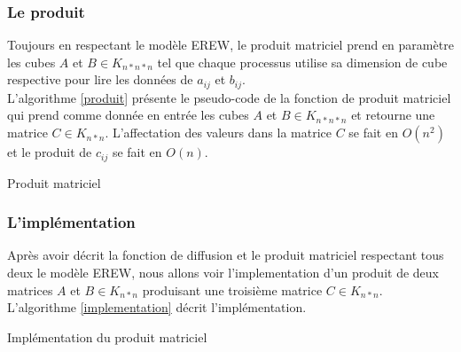 \subsubsection{Le produit}

Toujours en respectant le modèle EREW, le produit matriciel prend en paramètre les cubes $A$ et $B \in K_{n*n*n}$ tel que chaque processus utilise sa dimension de cube respective pour lire les données de $a_{ij}$ et $b_{ij}$.\\

L'algorithme \ref{produit} présente le pseudo-code de la fonction de produit matriciel qui prend comme donnée en entrée les cubes $A$ et $B \in K_{n*n*n}$ et retourne une matrice $C \in K_{n*n}$. L'affectation des valeurs dans la matrice $C$ se fait en $O(n^2)$ et le produit de $c_{ij}$ se fait en $O(n)$.

\incmargin{1em}
\begin{algorithm}
  \label{produit}
  \caption{Produit matriciel}
\end{algorithm}

\subsubsection{L'implémentation}

Après avoir décrit la fonction de diffusion et le produit matriciel respectant tous deux le modèle EREW, nous allons voir l'implementation d'un produit de deux matrices $A$ et $B \in K_{n*n}$ produisant une troisième matrice $C \in K_{n*n}$.\\

L'algorithme \ref{implementation} décrit l'implémentation.

\incmargin{1em}
\begin{algorithm}
  \label{implementation}
  \caption{Implémentation du produit matriciel}
\end{algorithm}
